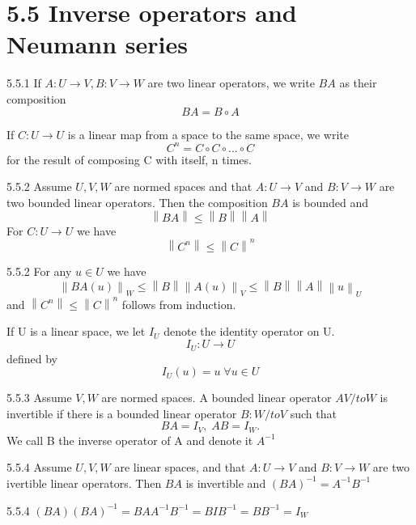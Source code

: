 \documentclass[a4paper,norsk]{article}
\renewcommand{\leq}{\leqslant}
\begin{document}
\section*{5.5 Inverse operators and Neumann series}

\begin{definitionbox}{5.5.1}{}
If $ A : U \to V, B : V \to W $ are two linear operators, we write $ BA $ as their composition
\[
    BA = B \circ A
\]

If $ C : U \to U $ is a linear map from a space to the same space, we write
\[
    C ^{n} = C \circ C \circ ... \circ C
\]
for the result of composing C with itself, n times.
\end{definitionbox}


\begin{lemmabox}{5.5.2}{}
Assume $ U, V, W $ are normed spaces and that $ A : U \to V $ and $ B : V \to W $ are two bounded linear operators. Then the composition $ BA $ is bounded and 
\[
    \left\lVert BA \right\rVert \leq \left\lVert B \right\rVert \left\lVert A \right\rVert 
\]
For $ C : U \to U $ we have
\[
    \left\lVert C^n \right\rVert \leq \left\lVert C \right\rVert ^{n} 
\]


\begin{proofbox}{5.5.2}{}
    For any $ u \in U $ we have
    \[
        \left\lVert BA(u) \right\rVert _W \leq \left\lVert B \right\rVert \left\lVert A(u) \right\rVert _V \leq \left\lVert B \right\rVert \left\lVert A \right\rVert \left\lVert u \right\rVert _U
    \]
    and $ \left\lVert C^n \right\rVert \leq \left\lVert C \right\rVert ^{n}  $ follows from induction.
\end{proofbox}
\end{lemmabox}



If U is a linear space, we let $ I_U  $ denote the identity operator on U. 
\[
    I_U : U \to U
\]
defined by
\[
    I_U(u) = u \; \forall  u \in U
\]

 
\begin{definitionbox}{5.5.3}{}
Assume $ V, W $ are normed spaces. A bounded linear operator $ A V /to W $ is invertible if there is a bounded linear operator $ B : W /to V $ such that
\[
    BA = I_V, \; AB = I_W.
\]
We call B the inverse operator of A and denote it $ A ^{-1}  $ 
\end{definitionbox}

\begin{propositionbox}{5.5.4}{}
Assume $ U, V, W $ are linear spaces, and that $ A : U \to V $ and $ B: V \to W $ are two ivertible linear operators. Then $ BA $ is invertible and $ \left( BA \right) ^{-1} = A ^{-1} B ^{-1}    $ 

\begin{proofbox}{5.5.4}{}
    $ \left( BA \right) \left( BA\right) ^{-1} = BA A ^{-1} B ^{-1} = B I B ^{-1} = B B ^{-1} = I_W       $ 
\end{proofbox}
\end{propositionbox}
\end{document}

